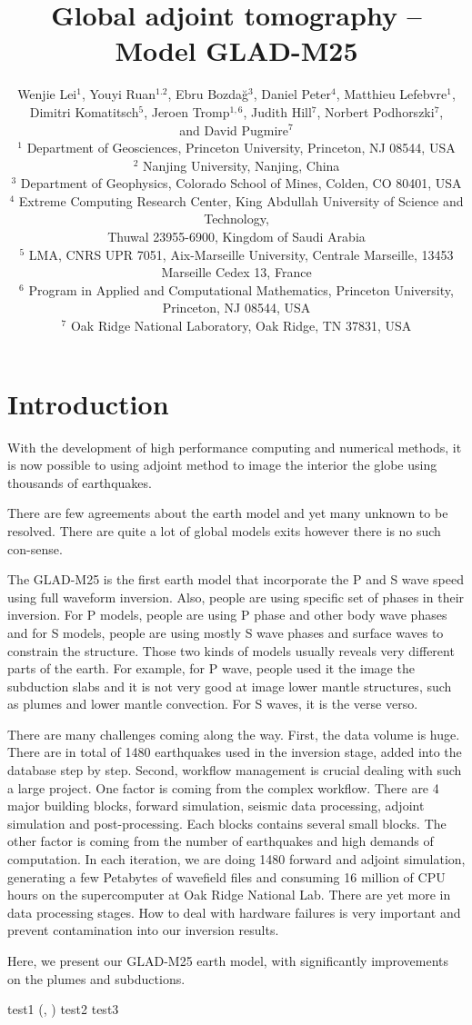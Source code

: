 \documentclass[extra,mreferee]{gji}
\title[Global Adjoint Tomography -- Model GLAD-M25]
  {Global adjoint tomography -- Model GLAD-M25}
\author[Lei et al.]
  {Wenjie Lei$^1$, Youyi Ruan$^{1.2}$, Ebru Bozda\u g$^3$, Daniel Peter$^4$, Matthieu Lefebvre$^1$, \\{\LARGE \rm Dimitri Komatitsch$^5$, Jeroen Tromp$^{1,6}$, Judith Hill$^7$, Norbert Podhorszki$^7$}, \\ {\LARGE \rm and David Pugmire$^7$} \\
  $^1$ Department of Geosciences, Princeton University, Princeton, NJ 08544, USA\\
  $^2$ Nanjing University, Nanjing, China\\
  $^3$ Department of Geophysics, Colorado School of Mines, Colden, CO 80401, USA\\
  $^4$ Extreme Computing Research Center, King Abdullah University of Science and Technology, \\Thuwal 23955-6900, Kingdom of Saudi Arabia\\
  $^5$ LMA, CNRS UPR 7051, Aix-Marseille University, Centrale Marseille, 13453 Marseille Cedex 13, France\\
  $^6$ Program in Applied and Computational Mathematics, Princeton University, Princeton, NJ 08544, USA\\
  $^7$ Oak Ridge National Laboratory, Oak Ridge, TN 37831, USA\\
  }
\begin{document}
\maketitle

\section{Introduction}
With the development of high performance computing and numerical methods, it is now possible to using adjoint method to image the interior the globe using thousands of earthquakes.

There are few agreements about the earth model and yet many unknown to be resolved. There are quite a lot of global models exits however there is no such con-sense.

The GLAD-M25 is the first earth model that incorporate the P and S wave speed using full waveform inversion. Also, people are using specific set of phases in their inversion. For P models, people are using P phase and other body wave phases and for S models, people are using mostly S wave phases and surface waves to constrain the structure. Those two kinds of models usually reveals very different parts of the earth. For example, for P wave, people used it the image the subduction slabs and it is not very good at image lower mantle structures, such as plumes and lower mantle convection. For S waves, it is the verse verso.

There are many challenges coming along the way. First, the data volume is huge.  There are in total of 1480 earthquakes used in the inversion stage, added into the database step by step. Second, workflow management is crucial dealing with such a large project. One factor is coming from the complex workflow. There are 4 major building blocks, forward simulation, seismic data processing, adjoint simulation and post-processing. Each blocks contains several small blocks. The other factor is coming from the number of earthquakes and high demands of computation. In each iteration, we are doing 1480 forward and adjoint simulation, generating a few Petabytes of wavefield files and consuming 16 million of CPU hours on the supercomputer at Oak Ridge National Lab. There are yet more in data processing stages. How to deal with hardware failures is very important and prevent contamination into our inversion results.

Here, we present our GLAD-M25 earth model, with significantly improvements on the plumes and subductions.

test1 (\cite{zhu2012structure}, \cite{zhu2012structure})
test2 \citep{zhu2015seismic, ekstrom2012global}
test3 \citet{ekstrom2012global}
\end{document}
